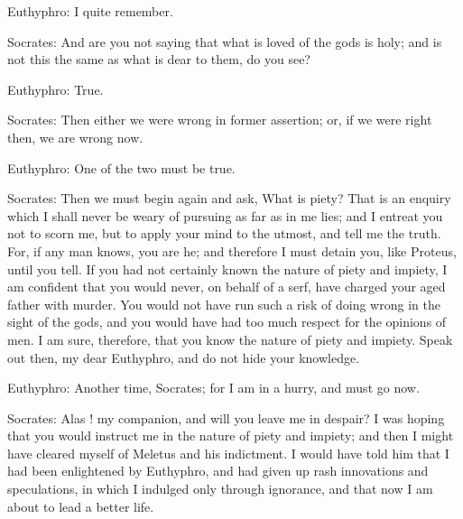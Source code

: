 Euthyphro: I quite remember.

Socrates: And are you not saying that what is loved of the gods is holy; and is not this the same as what is dear to them, do you see?

Euthyphro: True.

Socrates: Then either we were wrong in former assertion; or, if we were right then, we are wrong now.

Euthyphro: One of the two must be true.

Socrates: Then we must begin again and ask, What is piety? That is an enquiry which I shall never be weary of pursuing as far as in me lies; and I entreat you not to scorn me, but to apply your mind to the utmost, and tell me the truth. For, if any man knows, you are he; and therefore I must detain you, like Proteus, until you tell. If you had not certainly known the nature of piety and impiety, I am confident that you would never, on behalf of a serf, have charged your aged father with murder. You would not have run such a risk of doing wrong in the sight of the gods, and you would have had too much respect for the opinions of men. I am sure, therefore, that you know the nature of piety and impiety. Speak out then, my dear Euthyphro, and do not hide your knowledge.

Euthyphro: Another time, Socrates; for I am in a hurry, and must go now.

Socrates: Alas ! my companion, and will you leave me in despair? I was hoping that you would instruct me in the nature of piety and impiety; and then I might have cleared myself of Meletus and his indictment. I would have told him that I had been enlightened by Euthyphro, and had given up rash innovations and speculations, in which I indulged only through ignorance, and that now I am about to lead a better life.



